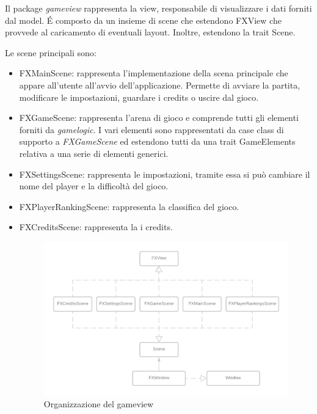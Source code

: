 Il package \textit{gameview} rappresenta la view, responsabile di visualizzare i dati forniti dal model. 
\'E composto da un insieme di scene che estendono FXView che provvede al caricamento di eventuali layout. Inoltre, estendono la trait Scene.

Le scene principali sono:
\begin{itemize}
    \item FXMainScene: rappresenta l'implementazione della scena principale che appare all'utente all'avvio dell'applicazione. Permette di avviare la partita, modificare le impostazioni, guardare i credits o uscire dal gioco.
    \item FXGameScene: rappresenta l'arena di gioco e comprende tutti gli elementi forniti da \textit{gamelogic}. I vari elementi sono rappresentati da case class di supporto a \textit{FXGameScene} ed estendono tutti da una trait GameElements relativa a una serie di elementi generici.
    \item FXSettingsScene: rappresenta le impostazioni, tramite essa si può cambiare il nome del player e la difficoltà del gioco.
    \item FXPlayerRankingScene: rappresenta la classifica del gioco.
    \item FXCreditsScene: rappresenta la i credits.
    
    \begin{figure}[H]
    \centering
      \includegraphics[width=14cm]{report/res/Scene_Diagram.png}
      \caption{Organizzazione del gameview}
      \label{notifyAction}
    \end{figure}
    
\end{itemize}